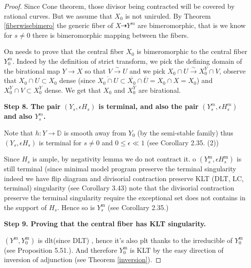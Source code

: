 \documentclass[11pt]{article}
\theoremstyle{definition}
\begin{document}
\begin{proof}
		Since Cone theorem, those divisor being contracted will be covered by rational curves. But we assume that $X_0$ is not uniruled. By Theorem \ref{fiberwisebimero} the generic fiber of $X \dashrightarrow Y^m$ are bimeromorphic, that is we know for $s\ne 0$ there is bimeromorphic mapping between the fibers.
		
		On needs to prove that the central fiber $X_0$ is bimeromorphic to the central fiber $Y_0^m$. Indeed by the definition of strict transform, we pick the defining domain of the birational map $Y \to X$ so that $V\stackrel{\sim}\to U$ and we pick $X_0 \cap U \stackrel{\sim}\to X_0^Y \cap V$, observe that $X_0\cap U \subset X_0$ dense (since $\overline{ X_0 \cap U}\subset \overline{X_0}\cap \overline{U} = X_0 \cap X = X_0$) and $X_0^Y \cap V\subset X_0^Y$ dense. We get that $X_0$ and $X_0^Y$ are birational.
		
		\textbf{Step 8. The pair $(Y_s,\epsilon H_s)$ is terminal, and also the pair $(Y_s^m, \epsilon H_s^m)$ and also $Y_s^m$.}
		
		Note that $h:Y \to \mathbb{D}$ is smooth away from $Y_0$ (by the semi-stable family) thus $\left(Y_s, \epsilon H_s\right)$ is terminal for $s \neq 0$ and $0 \leq \epsilon \ll 1$ (see \cite{KollarMori} Corollary 2.35. (2))
		
		Since $H_s$ is ample, by negativity lemma we do not contract it. o $\left(Y_s^{\mathrm{m}}, \epsilon H_s^{\mathrm{m}}\right)$ is still terminal (since minimal model program preserve the terminal singularity indeed we have flip diagram and divisorial contraction preserve KLT (DLT, LC, terminal) singularity (see \cite{KollarMori} Corollary 3.43) note that the divisorial contraction preserve the terminal singularity require the exceptional set does not contains in the support of $H_s$. Hence so is $Y_s^{\mathrm{m}}$ (see \cite{KollarMori} Corollary 2.35.)
		
		\textbf{Step 9. Proving that the central fiber has KLT singularity.}
		
		
		 $\left(Y^{\mathrm{m}}, Y_0^{\mathrm{m}}\right)$ is dlt(since DLT) , hence it's also plt thanks to the irreducible of $Y_0^{\mathrm{m}}$ (see \cite{KollarMori} Proposition 5.51.). And therefore $Y_0^{\mathrm{m}}$ is KLT by the easy direction of inversion of adjunction (see Theorem \ref{inversion}).
	\end{proof}
	\printbibliography	
	
\end{document}
